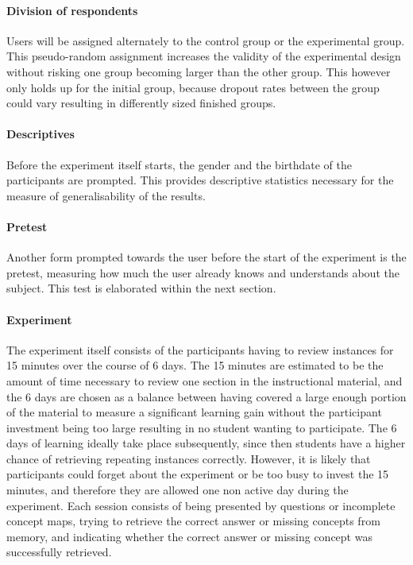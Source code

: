 \paragraph{Division of respondents} Users will be assigned alternately to the control group or the experimental group. This pseudo-random assignment increases the validity of the experimental design without risking one group becoming larger than the other group. This however only holds up for the initial group, because dropout rates between the group could vary resulting in differently sized finished groups.

\paragraph{Descriptives} Before the experiment itself starts, the gender and the birthdate of the participants are prompted. This provides descriptive statistics necessary for the measure of generalisability of the results.

\paragraph{Pretest} Another form prompted towards the user before the start of the experiment is the pretest, measuring how much the user already knows and understands about the subject. This test is elaborated within the next section.

\paragraph{Experiment} The experiment itself consists of the participants having to review instances for 15 minutes over the course of 6 days. The 15 minutes are estimated to be the amount of time necessary to review one section in the instructional material, and the 6 days are chosen as a balance between having covered a large enough portion of the material to measure a significant learning gain without the participant investment being too large resulting in no student wanting to participate. The 6 days of learning ideally take place subsequently, since then students have a higher chance of retrieving repeating instances correctly. However, it is likely that participants could forget about the experiment or be too busy to invest the 15 minutes, and therefore they are allowed one non active day during the experiment. Each session consists of being presented by questions or incomplete concept maps, trying to retrieve the correct answer or missing concepts from memory, and indicating whether the correct answer or missing concept was successfully retrieved.

